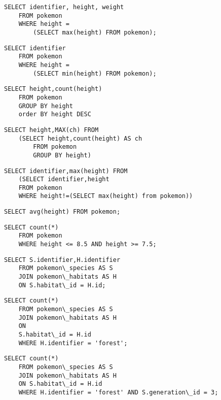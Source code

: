 \question{}
\begin{lstlisting}
SELECT identifier, height, weight
	FROM pokemon 
	WHERE height = 
		(SELECT max(height) FROM pokemon);
\end{lstlisting}


\question{}
\begin{lstlisting}
SELECT identifier
	FROM pokemon 
	WHERE height = 
		(SELECT min(height) FROM pokemon); 
\end{lstlisting}


\question{}
\begin{lstlisting}
SELECT height,count(height) 
	FROM pokemon 
	GROUP BY height
	order BY height DESC
\end{lstlisting}

\question{}
\begin{lstlisting}
SELECT height,MAX(ch) FROM 
	(SELECT height,count(height) AS ch
		FROM pokemon 
		GROUP BY height)
\end{lstlisting}

\question{}
\begin{lstlisting}
SELECT identifier,max(height) FROM 
	(SELECT identifier,height 
	FROM pokemon 
	WHERE height!=(SELECT max(height) from pokemon))
\end{lstlisting}



\question{}%
\begin{lstlisting}
SELECT avg(height) FROM pokemon;
\end{lstlisting}
 
\question{}
\begin{lstlisting}
SELECT count(*) 
	FROM pokemon 
	WHERE height <= 8.5 AND height >= 7.5;
\end{lstlisting}

\question{}
\begin{lstlisting}
SELECT S.identifier,H.identifier 
	FROM pokemon\_species AS S 
	JOIN pokemon\_habitats AS H 
	ON S.habitat\_id = H.id;
\end{lstlisting}

\question{}
\begin{lstlisting}
SELECT count(*) 
	FROM pokemon\_species AS S 
	JOIN pokemon\_habitats AS H 
	ON 
	S.habitat\_id = H.id 
	WHERE H.identifier = 'forest';
\end{lstlisting}  

\question{}
\begin{lstlisting}
SELECT count(*) 
	FROM pokemon\_species AS S 
	JOIN pokemon\_habitats AS H 
	ON S.habitat\_id = H.id 
	WHERE H.identifier = 'forest' AND S.generation\_id = 3;
\end{lstlisting} 


